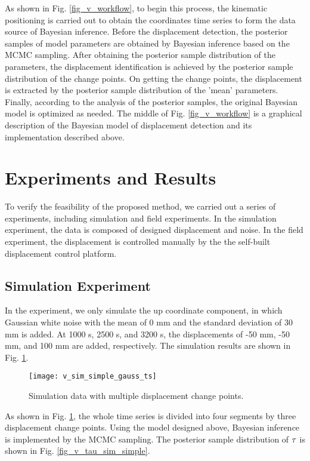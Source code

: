 \documentclass[final,3p,times]{elsarticle}
\begin{document}
	As shown in Fig. \ref{fig_v_workflow}, to begin this process, the kinematic positioning is carried out to obtain the coordinates time series to form the data source of Bayesian inference. 
	Before the displacement detection,  the posterior samples of model parameters are obtained by Bayesian inference based on the MCMC sampling.
	After obtaining the posterior sample distribution of the parameters, the displacement identification is achieved by the posterior sample distribution of the change points.
	On getting the change points, the displacement is extracted by the posterior sample distribution of  the 'mean' parameters.
	Finally, according to the analysis of the posterior samples, the original Bayesian model is optimized as needed.
	The middle of Fig. \ref{fig_v_workflow} is a graphical description of the Bayesian model of displacement detection and its implementation described above.
	
	\section{Experiments and Results}
	\label{exp}
	To verify the feasibility of the proposed method, we carried out a series of experiments, including simulation and field experiments. 
	In the simulation experiment, the data is composed of designed displacement and noise.
	In the field experiment, the displacement is controlled manually by the  the self-built displacement control platform.
	
	\subsection{Simulation Experiment}
	In the experiment, we only simulate the up coordinate component, in which Gaussian white noise with the mean of 0 mm and the standard deviation of 30 mm is added.
	At 1000 s, 2500 s, and 3200 s, the displacements of -50 mm, -50 mm, and 100 mm are added, respectively. 
	The simulation results are shown in Fig. \ref{fig_v_sim_simple_gauss_ts}.
	
	\begin{figure}[htbp]
		\centering
		\texttt{[image: v\_sim\_simple\_gauss\_ts]}
		\caption{Simulation data with multiple displacement change points.}
		\label{fig_v_sim_simple_gauss_ts}
	\end{figure} 
	As shown in Fig. \ref{fig_v_sim_simple_gauss_ts}, the whole time series is divided into four segments by three displacement change points. 
	Using the model designed above, Bayesian inference is implemented by the MCMC sampling. 
	The posterior sample distribution of $\bf{\tau}$ is shown in Fig. \ref{fig_v_tau_sim_simple}.
	
\end{document}
